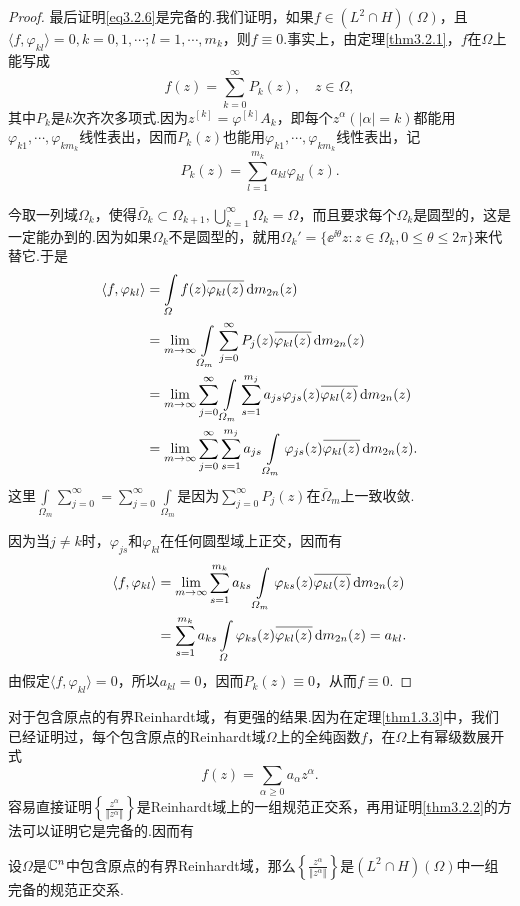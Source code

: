 \begin{proof}
最后证明\eqref{eq3.2.6}是完备的.我们证明，如果$f\in(L^2\cap H)(\Omega)$，且$\langle f,\varphi_{kl}\rangle=0,k=0,1,\cdots;l=1,\cdots,m_k$，则$f\equiv0$.事实上，由定理\ref{thm3.2.1}，$f$在$\Omega$上能写成
\begin{equation}\label{eq3.2.7}
	f(z)=\sum_{k=0}^{\infty}P_k(z),\quad z\in\Omega,
\end{equation}
其中$P_k$是$k$次齐次多项式.因为$z^{[k]}=\varphi^{[k]}A_k$，即每个$z^\alpha(|\alpha|=k)$都能用$\varphi_{k1},\cdots,\varphi_{km_k}$线性表出，因而$P_k(z)$也能用$\varphi_{k1},\cdots,\varphi_{km_k}$线性表出，记
\[P_k(z)=\sum_{l=1}^{m_k}a_{kl}\varphi_{kl}(z).\]

今取一列域$\Omega_k$，使得$\bar{\Omega}_k\subset\Omega_{k+1},\bigcup\limits_{k=1}^\infty \Omega_k=\Omega$，而且要求每个$\Omega_k$是圆型的，这是一定能办到的.因为如果$\Omega_k$不是圆型的，就用$\Omega_k'=\{\ee^{\ii\theta}z\colon z\in\Omega_k,0\le\theta\le2\pi\}$来代替它.于是
\begin{align*}
	\langle f,\varphi_{kl}\rangle
	&=\int\limits_\varOmega f(z){}\mkern1mu\overline{\mkern-1mu\varphi_{kl}(z)}\mathop{}\!\mathrm{d} m_{2n}(z)\\
	&=\lim_{m\to\infty}\int\limits_{\varOmega_m}\sum_{j=0}^{\infty} P_j(z){}\mkern1mu\overline{\mkern-1mu\varphi_{kl}(z)}\mathop{}\!\mathrm{d} m_{2n}(z)\\
	&=\lim_{m\to\infty}\sum_{j=0}^{\infty}\int\limits_{\varOmega_m}\sum_{s=1}^{m_j}a_{js}\varphi_{js}(z){}\mkern1mu\overline{\mkern-1mu\varphi_{kl}(z)}\mathop{}\!\mathrm{d} m_{2n}(z)\\
	&=\lim_{m\to\infty}\sum_{j=0}^{\infty}\sum_{s=1}^{m_j}a_{js}\int\limits_{\varOmega_m}\varphi_{js}(z){}\mkern1mu\overline{\mkern-1mu\varphi_{kl}(z)}\mathop{}\!\mathrm{d} m_{2n}(z).
\end{align*}
这里$\int\limits_{\Omega_m}\sum_{j=0}^{\infty}=\sum_{j=0}^{\infty}\int\limits_{\Omega_m}$是因为$\sum_{j=0}^{\infty}P_j(z)$在$\bar{\Omega}_m$上一致收敛.

因为当$j\neq k$时，$\varphi_{js}$和$\varphi_{kl}$在任何圆型域上正交，因而有
\begin{align*}
	\langle f,\varphi_{kl}\rangle
	&=\lim_{m\to\infty}\sum_{s=1}^{m_k}a_{ks}\int\limits_{\varOmega_m}\varphi_{ks}(z){}\mkern1mu\overline{\mkern-1mu\varphi_{kl}(z)}\mathop{}\!\mathrm{d} m_{2n}(z)\\
	&=\sum_{s=1}^{m_k}a_{ks}\int\limits_\varOmega \varphi_{ks}(z){}\mkern1mu\overline{\mkern-1mu\varphi_{kl}(z)}\mathop{}\!\mathrm{d} m_{2n}(z)=a_{kl}.
\end{align*}
由假定$\langle f,\varphi_{kl}\rangle=0$，所以$a_{kl}=0$，因而$P_k(z)\equiv0$，从而$f\equiv0$.
\end{proof}
对于包含原点的有界Reinhardt域，有更强的结果.因为在定理\ref{thm1.3.3}中，我们已经证明过，每个包含原点的Reinhardt域$\Omega$上的全纯函数$f$，在$\Omega$上有幂级数展开式
\[f(z)=\sum_{\alpha\ge0}a_\alpha z^\alpha.\]
容易直接证明$\left\{\frac{z^\alpha}{\Vert z^\alpha\Vert}\right\}$是Reinhardt域上的一组规范正交系，再用证明\ref{thm3.2.2}的方法可以证明它是完备的.因而有
\begin{theorem}\label{thm3.2.3}
	设$\Omega$是$\mathbb C^n$中包含原点的有界Reinhardt域，那么$\left\{\frac{z^\alpha}{\Vert z^\alpha\Vert}\right\}$是$(L^2\cap H)(\Omega)$中一组完备的规范正交系.
\end{theorem}
